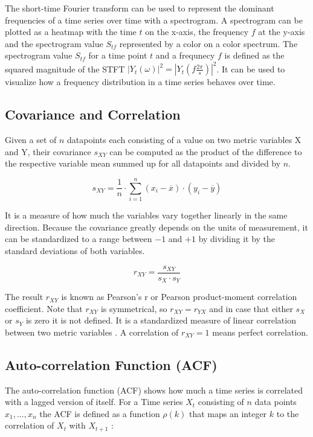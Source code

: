 \documentclass[12 pt]{scrartcl}
\begin{document}
The short-time Fourier transform can be used to represent the dominant frequencies of a time series over time with a spectrogram.
A spectrogram can be plotted as a heatmap with the time $t$ on the x-axis, the frequency $f$ at the y-axis and the spectrogram value $S_{tf}$ represented by a color on a color spectrum.
The spectrogram value $S_{tf}$ for a time point $t$ and a frequnecy $f$ is defined as the squared magnitude of the STFT $|Y_t(\omega)|^2 = |Y_t(f \frac{2 \pi}{s})|^2$.
It can be used to visualize how a frequency distribution in a time series behaves over time.

\subsection{Covariance and Correlation}

Given a set of $n$ datapoints each consisting of a value on two metric variables X and Y, their covariance $s_{XY}$ can be computed as the product of the difference to the respective variable mean summed up for all datapoints and divided by $n$.

\[ s_{XY} = \frac{1}{n} \cdot  \sum_{i=1}^{n}{(x_i - \overline{x}) \cdot (y_i - \overline{y})}\]

It is a measure of how much the variables vary together linearly in the same direction.
Because the covariance greatly depends on the units of measurement, it can be standardized to a range between $-1$ and $+1$ by dividing it by the standard deviations of both variables.

\[ r_{XY} =  \frac{s_{XY}}{s_X \cdot s_Y} \]

The result $r_{XY}$ is known as Pearson's r or Pearson product-moment correlation coefficient. Note that $r_{XY}$ is symmetrical, so $r_{XY} = r_{YX}$ and in case that either $s_X$ or $s_Y$ is zero it is not defined. It is a standardized measure of linear correlation between two metric variables \citep[p.~538]{eid2017statistik}. A correlation of $r_{XY} = 1$ means perfect correlation.


\subsection{Auto-correlation Function (ACF)}

The auto-correlation function (ACF) shows how much a time series is correlated with a lagged version of itself. For a Time series $X_t$ consisting of $n$ data points $x_1, ..., x_n$ the ACF is defined as a function $\rho(k)$ that maps an integer $k$ to the correlation of $X_t$ with $X_{t+1}$ \citep[p.~4]{deistler2022time}:
\end{document}
